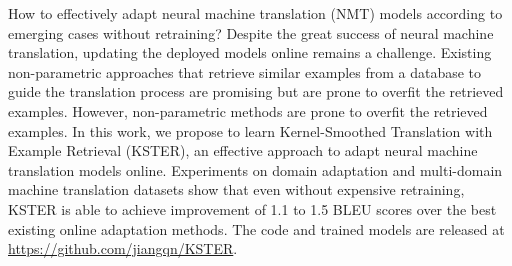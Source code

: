 How to effectively adapt neural machine translation (NMT) models according to emerging cases without retraining? Despite the great success of neural machine translation, updating the deployed models online remains a challenge. Existing non-parametric approaches that retrieve similar examples from a database to guide the translation process are promising but are prone to overfit the retrieved examples. However, non-parametric methods are prone to overfit the retrieved examples. In this work, we propose to learn Kernel-Smoothed Translation with Example Retrieval (KSTER), an effective approach to adapt neural machine translation models online. Experiments on domain adaptation and multi-domain machine translation datasets show that even without expensive retraining, KSTER is able to achieve improvement of 1.1 to 1.5 BLEU scores over the best existing online adaptation methods. The code and trained models are released at \href{https://github.com/jiangqn/KSTER}{https://github.com/jiangqn/KSTER}.
